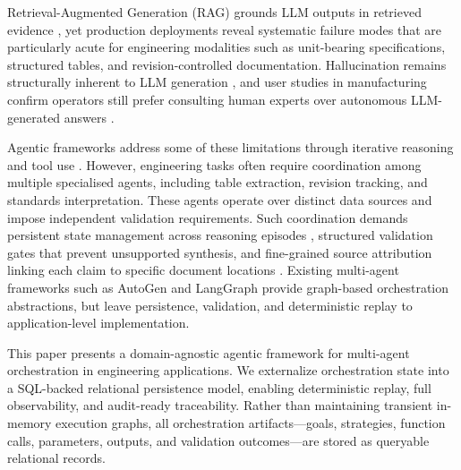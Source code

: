 \documentclass[largeformat]{interact}
\begin{document}
Retrieval-Augmented Generation (RAG) grounds LLM outputs in retrieved evidence \cite{lewis2020rag}, yet production deployments reveal systematic failure modes
that are particularly acute for engineering modalities such as unit-bearing
specifications, structured tables, and revision-controlled documentation. Hallucination remains structurally inherent to LLM generation \cite{huang2025hallucinationsurvey, kalai2025hallucinate}, and user studies in manufacturing confirm operators still prefer consulting human experts over autonomous LLM-generated answers \cite{kernanfreire2024knowledge}.

Agentic frameworks address some of these limitations through iterative reasoning and tool use \cite{yao2023reactsynergizingreasoningacting, wang2024autonomousagents}. However, engineering tasks often require coordination among multiple specialised agents, including table extraction, revision tracking, and standards interpretation. These agents operate over distinct data sources and impose independent validation requirements. Such coordination demands persistent state management across reasoning episodes \cite{packer2023memgpt}, structured validation gates that prevent unsupported synthesis, and fine-grained source attribution linking each claim to specific document locations \cite{rashkin2023attribution}. Existing multi-agent frameworks such as AutoGen \cite{wu2024autogen} and LangGraph provide graph-based orchestration abstractions, but leave persistence, validation, and deterministic replay to application-level implementation.

This paper presents a domain-agnostic agentic framework for multi-agent orchestration in engineering applications. We externalize orchestration state into a SQL-backed relational persistence model, enabling deterministic replay, full observability, and audit-ready traceability. Rather than maintaining transient in-memory execution graphs, all orchestration artifacts—goals, strategies, function calls, parameters, outputs, and validation outcomes—are stored as queryable relational records.
\end{document}

